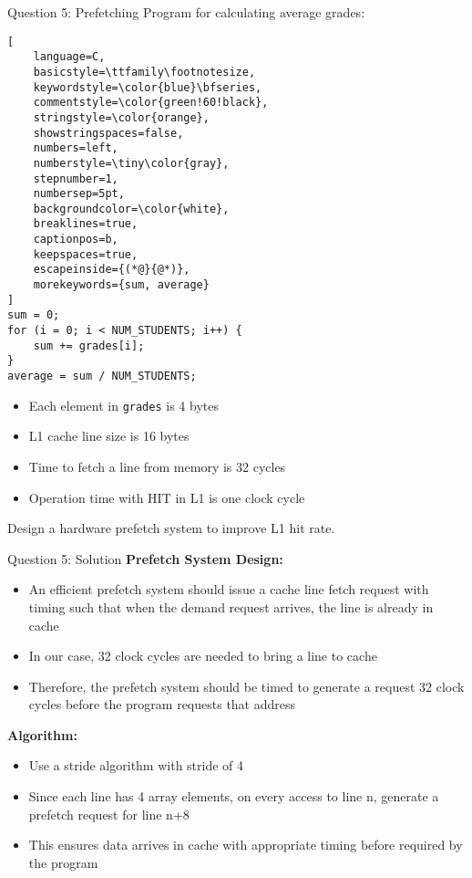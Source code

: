 \documentclass[aspectratio=169,12pt]{beamer}
\begin{document}
\begin{frame}[fragile]{Question 5: Prefetching}
Program for calculating average grades:

\vspace{0.3cm}
\begin{tcolorbox}[
    colback=gray!5,
    colframe=gray!50,
    boxrule=0.5pt,
    arc=2mm,
    left=2mm,
    right=2mm,
    top=1mm,
    bottom=1mm,
    fontupper=\small
]
\begin{lstlisting}[
    language=C,
    basicstyle=\ttfamily\footnotesize,
    keywordstyle=\color{blue}\bfseries,
    commentstyle=\color{green!60!black},
    stringstyle=\color{orange},
    showstringspaces=false,
    numbers=left,
    numberstyle=\tiny\color{gray},
    stepnumber=1,
    numbersep=5pt,
    backgroundcolor=\color{white},
    breaklines=true,
    captionpos=b,
    keepspaces=true,
    escapeinside={(*@}{@*)},
    morekeywords={sum, average}
]
sum = 0;
for (i = 0; i < NUM_STUDENTS; i++) {
    sum += grades[i];
}
average = sum / NUM_STUDENTS;
\end{lstlisting}
\end{tcolorbox}

\vspace{0.2cm}
\begin{itemize}
    \item Each element in \texttt{grades} is 4 bytes
    \item L1 cache line size is 16 bytes
    \item Time to fetch a line from memory is 32 cycles
    \item Operation time with HIT in L1 is one clock cycle
\end{itemize}

Design a hardware prefetch system to improve L1 hit rate.
\end{frame}

\begin{frame}{Question 5: Solution}
\textbf{Prefetch System Design:}

\begin{itemize}
    \item An efficient prefetch system should issue a cache line fetch request with timing such that when the demand request arrives, the line is already in cache
    \item In our case, 32 clock cycles are needed to bring a line to cache
    \item Therefore, the prefetch system should be timed to generate a request 32 clock cycles before the program requests that address
\end{itemize}

\textbf{Algorithm:}
\begin{itemize}
    \item Use a stride algorithm with stride of 4
    \item Since each line has 4 array elements, on every access to line n, generate a prefetch request for line n+8
    \item This ensures data arrives in cache with appropriate timing before required by the program
\end{itemize}
\end{frame}
\end{document}
